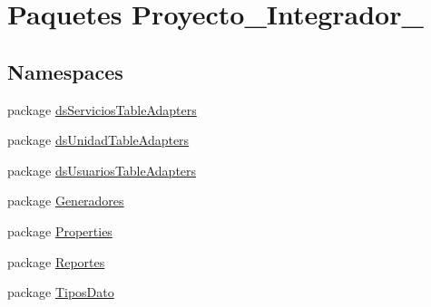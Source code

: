 \hypertarget{namespace_proyecto___integrador__3}{\section{Paquetes Proyecto\-\_\-\-Integrador\-\_}
\label{namespace_proyecto___integrador__3}
}
\subsection*{Namespaces}
\begin{DoxyCompactItemize}
\item 
package \hyperlink{namespace_proyecto___integrador__3_1_1ds_servicios_table_adapters}{ds\-Servicios\-Table\-Adapters}
\item 
package \hyperlink{namespace_proyecto___integrador__3_1_1ds_unidad_table_adapters}{ds\-Unidad\-Table\-Adapters}
\item 
package \hyperlink{namespace_proyecto___integrador__3_1_1ds_usuarios_table_adapters}{ds\-Usuarios\-Table\-Adapters}
\item 
package \hyperlink{namespace_proyecto___integrador__3_1_1_generadores}{Generadores}
\item 
package \hyperlink{namespace_proyecto___integrador__3_1_1_properties}{Properties}
\item 
package \hyperlink{namespace_proyecto___integrador__3_1_1_reportes}{Reportes}
\item 
package \hyperlink{namespace_proyecto___integrador__3_1_1_tipos_dato}{Tipos\-Dato}
\end{DoxyCompactItemize}
